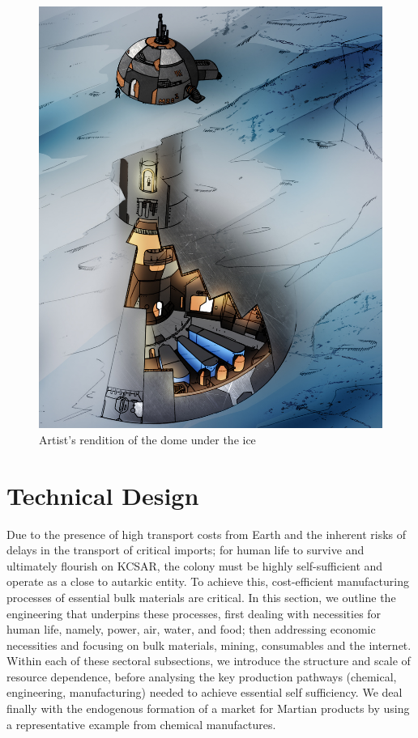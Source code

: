 \documentclass[fleqn,10pt]{Stylesheet} %
\begin{document}
\begin{figure}
    \centering
    \includegraphics[width=\linewidth]{art/dome_crop.jpg}
    \caption{Artist's rendition of the dome under the ice}
    \label{fig:dome}
\end{figure}


\section{Technical Design}
\label{sec:technical-design}

Due to the presence of high transport costs from Earth and the inherent risks of delays in the transport of critical imports; for human life to survive and ultimately flourish on KCSAR, the colony must be highly self-sufficient and operate as a close to autarkic entity. To achieve this, cost-efficient manufacturing processes of essential bulk materials are critical. In this section, we outline the engineering that underpins these processes, first dealing with necessities for human life, namely, power, air, water, and food; then addressing economic necessities and focusing on bulk materials, mining, consumables and the internet. Within each of these sectoral subsections, we introduce the structure and scale of resource dependence, before analysing the key production pathways (chemical, engineering, manufacturing) needed to achieve essential self sufficiency. We deal finally with the endogenous formation of a market for Martian products by using a representative example from chemical manufactures.
\end{document}
